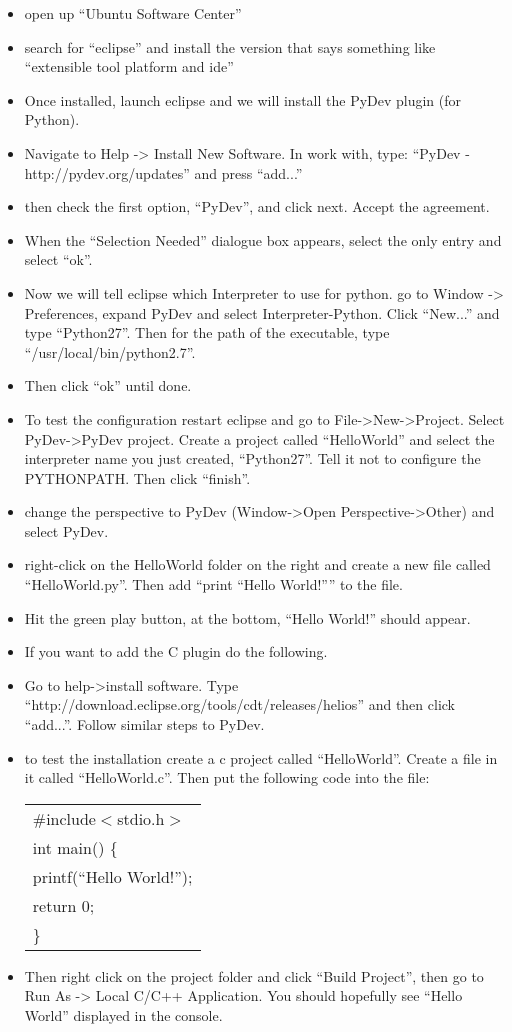 \documentclass{article}
\begin{document}
\begin{enumerate}
	\begin{itemize}
		\item open up ``Ubuntu Software Center''
		\item search for ``eclipse'' and install the version that says something like ``extensible tool platform and ide''
		\item Once installed, launch eclipse and we will install the PyDev plugin (for Python). 
		\item Navigate to Help -> Install New Software. In work with, type: ``PyDev - http://pydev.org/updates'' and press ``add...''
		\item then check the first option, ``PyDev'', and click next. Accept the agreement. 
		\item When the ``Selection Needed'' dialogue box appears, select the only entry and select ``ok''. 
		\item Now we will tell eclipse which Interpreter to use for python. go to Window -> Preferences, expand PyDev and select
		Interpreter-Python. Click ``New...'' and type ``Python27''. Then for the path of the executable, type ``/usr/local/bin/python2.7''. 
		\item Then click ``ok'' until done. 
		\item To test the configuration restart eclipse and go to File->New->Project. Select PyDev->PyDev project. Create a project called ``HelloWorld'' and
		select the interpreter name you just created, ``Python27''. Tell it not to configure the PYTHONPATH. Then click ``finish''. 
		\item change the perspective to PyDev (Window->Open Perspective->Other) and select PyDev. 
		\item right-click on the HelloWorld folder on the right and create a new file called ``HelloWorld.py''. Then add ``print ``Hello World!'''' to the file. 
		\item Hit the green play button, at the bottom, ``Hello World!'' should appear. 
		\item If you want to add the C plugin do the following. 
		\item Go to help->install software. Type ``http://download.eclipse.org/tools/cdt/releases/helios'' and then click ``add...''. Follow similar steps to PyDev. 
		\item to test the installation create a c project called ``HelloWorld''. Create a file in it called ``HelloWorld.c''. Then put the following code into the file:
		\begin{tabular}{l}
			$\#$include$<$stdio.h$>$ \\
			int main() \{ \\
				printf(``Hello World!''); \\
				return 0; \\
			\} \\
		\end{tabular}
		\item Then right click on the project folder and click ``Build Project'', then go to Run As -> Local C/C++ Application. You should hopefully see ``Hello World'' displayed in the console. 
	\end{itemize}


\end{enumerate}
\end{document}
